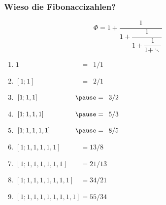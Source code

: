 \documentclass[12pt,compress,english,utf8,t]{beamer}
\newcommand{\icfrac}[4]{#1 + \dfrac{1}{#2 + \dfrac{1}{#3 + \dfrac{1}{#4 + \ddots}}}}
\begin{document}

\begin{frame}\frametitle{Wieso die Fibonaccizahlen?}
  \vspace*{-1em}
  \[ \Phi = \icfrac{1}{1}{1}{1} \]

  \begin{enumerate}
    \item $1\phantom{[,1,1,1,1,1,1,1,1]} = \phantom{0}1/1$
    \item $[1;1]\phantom{,1,1,1,1,1,1,1} = \phantom{0}2/1$
    \item $[1;1,1]\phantom{,1,1,1,1,1,1} \pause = \phantom{0}3/2$
    \item $[1;1,1,1]\phantom{,1,1,1,1,1} \pause = \phantom{0}5/3$
    \item $[1;1,1,1,1]\phantom{,1,1,1,1} \pause = \phantom{0}8/5$ \pause
    \item $[1;1,1,1,1,1]\phantom{,1,1,1} = 13/8$
    \item $[1;1,1,1,1,1,1]\phantom{,1,1} = 21/13$
    \item $[1;1,1,1,1,1,1,1]\phantom{,1} = 34/21$
    \item $[1;1,1,1,1,1,1,1,1] = 55/34$
  \end{enumerate}
\end{frame}
\end{document}
